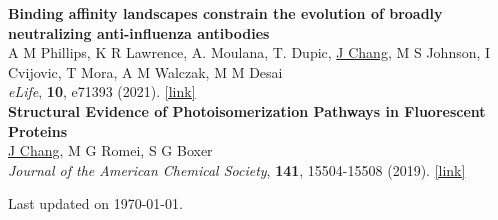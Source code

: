 \documentclass[margin,11pt]{res}
\begin{document}
\begin{resume}
\begin{changemargin}{-8.5em}{0em}
    \textbf{Binding affinity landscapes constrain the evolution of broadly neutralizing anti-influenza antibodies}
    \\
    A M Phillips, K R Lawrence, A. Moulana, T. Dupic, \underline{J Chang}, M S Johnson, I Cvijovic, T Mora, A M Walczak, M M Desai
    \\
    \textit{eLife},
    \textbf{10},
    e71393
    (2021).
    \href{https://doi.org/10.7554/eLife.71393}{[link]}
    \\

    \textbf{Structural Evidence of Photoisomerization Pathways in Fluorescent Proteins}
    \\
    \underline{J Chang}, M G Romei, S G Boxer
    \\
    \textit{Journal of the American Chemical Society},
    \textbf{141},
    15504-15508
    (2019).
    \href{http://dx.doi.org/10.1021/jacs.9b08356}{[link]}
\end{changemargin}

\end{resume}

\vfill\hfill{\scriptsize Last updated on \today.}
\end{document}
